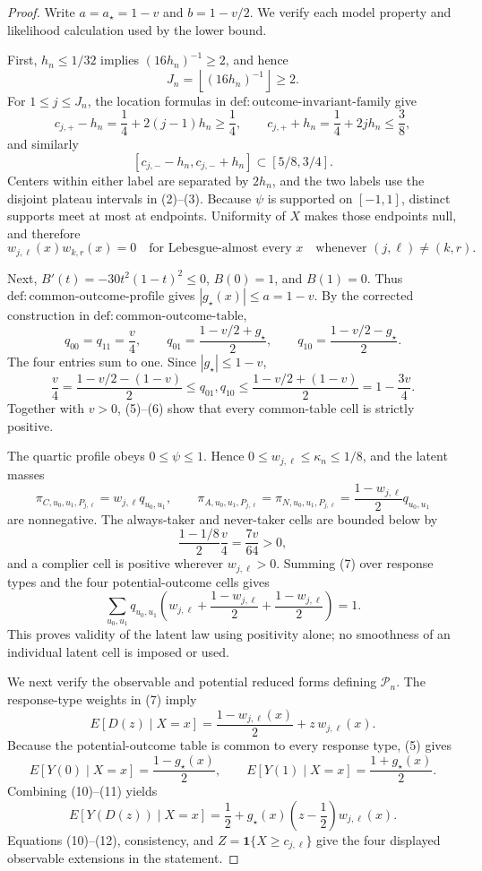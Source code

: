 \documentclass{article}
\begin{document}
\begin{proof}
Write \(a=a_\star=1-v\) and \(b=1-v/2\).  We verify each model property and likelihood calculation used by the lower bound.

First, \(h_n\le1/32\) implies \((16h_n)^{-1}\ge2\), and hence
\[
J_n=\left\lfloor(16h_n)^{-1}\right\rfloor\ge2.
\tag{1}
\]
For \(1\le j\le J_n\), the location formulas in \(\mathrm{def:outcome\mbox{-}invariant\mbox{-}family}\) give
\[
c_{j,+}-h_n=\frac14+2(j-1)h_n\ge\frac14,
\qquad
c_{j,+}+h_n=\frac14+2jh_n\le\frac38,
\tag{2}
\]
and similarly
\[
[c_{j,-}-h_n,c_{j,-}+h_n]\subset[5/8,3/4].
\tag{3}
\]
Centers within either label are separated by \(2h_n\), and the two labels use the disjoint plateau intervals in (2)--(3).  Because \(\psi\) is supported on \([-1,1]\), distinct supports meet at most at endpoints.  Uniformity of \(X\) makes those endpoints null, and therefore
\[
w_{j,\ell}(x)w_{k,r}(x)=0
\quad\text{for Lebesgue-almost every }x
\quad\text{whenever }(j,\ell)\ne(k,r).
\tag{4}
\]

Next, \(B'(t)=-30t^2(1-t)^2\le0\), \(B(0)=1\), and \(B(1)=0\).  Thus \(\mathrm{def:common\mbox{-}outcome\mbox{-}profile}\) gives \(|g_\star(x)|\le a=1-v\).  By the corrected construction in \(\mathrm{def:common\mbox{-}outcome\mbox{-}table}\),
\[
q_{00}=q_{11}=\frac v4,
\qquad
q_{01}=\frac{1-v/2+g_\star}{2},
\qquad
q_{10}=\frac{1-v/2-g_\star}{2}.
\tag{5}
\]
The four entries sum to one.  Since \(|g_\star|\le1-v\),
\[
\frac v4
=\frac{1-v/2-(1-v)}2
\le q_{01},q_{10}
\le\frac{1-v/2+(1-v)}2
=1-\frac{3v}{4}.
\tag{6}
\]
Together with \(v>0\), (5)--(6) show that every common-table cell is strictly positive.

The quartic profile obeys \(0\le\psi\le1\).  Hence \(0\le w_{j,\ell}\le\kappa_n\le1/8\), and the latent masses
\[
\pi_{C,u_0,u_1,P_{j,\ell}}=w_{j,\ell}q_{u_0,u_1},
\qquad
\pi_{A,u_0,u_1,P_{j,\ell}}
=\pi_{N,u_0,u_1,P_{j,\ell}}
=\frac{1-w_{j,\ell}}2q_{u_0,u_1}
\tag{7}
\]
are nonnegative.  The always-taker and never-taker cells are bounded below by
\[
\frac{1-1/8}{2}\frac v4=\frac{7v}{64}>0,
\tag{8}
\]
and a complier cell is positive wherever \(w_{j,\ell}>0\).  Summing (7) over response types and the four potential-outcome cells gives
\[
\sum_{u_0,u_1}q_{u_0,u_1}
\left(w_{j,\ell}+\frac{1-w_{j,\ell}}2+
                    \frac{1-w_{j,\ell}}2\right)=1.
\tag{9}
\]
This proves validity of the latent law using positivity alone; no smoothness of an individual latent cell is imposed or used.

We next verify the observable and potential reduced forms defining \(\mathcal P_n\).  The response-type weights in (7) imply
\[
E[D(z)\mid X=x]=\frac{1-w_{j,\ell}(x)}2+z\,w_{j,\ell}(x).
\tag{10}
\]
Because the potential-outcome table is common to every response type, (5) gives
\[
E[Y(0)\mid X=x]=\frac{1-g_\star(x)}2,
\qquad
E[Y(1)\mid X=x]=\frac{1+g_\star(x)}2.
\tag{11}
\]
Combining (10)--(11) yields
\[
E[Y(D(z))\mid X=x]
=\frac12+g_\star(x)\left(z-\frac12\right)w_{j,\ell}(x).
\tag{12}
\]
Equations (10)--(12), consistency, and \(Z=\mathbf 1\{X\ge c_{j,\ell}\}\) give the four displayed observable extensions in the statement.


\end{proof}
\end{document}

